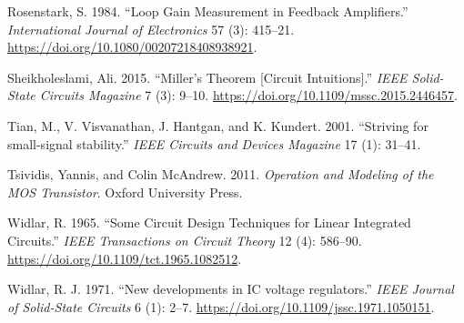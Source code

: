 \documentclass[
  a4paper,
  DIV=11,
  numbers=noendperiod]{scrartcl}
\newlength{\cslhangindent}
\newenvironment{CSLReferences}[2] %
 {\begin{list}{}{%
  \setlength{\itemindent}{0pt}
  \setlength{\leftmargin}{0pt}
  \setlength{\parsep}{0pt}
  \ifodd #1
   \setlength{\leftmargin}{\cslhangindent}
   \setlength{\itemindent}{-1\cslhangindent}
  \fi
  \setlength{\itemsep}{#2\baselineskip}}}
 {\end{list}}
\begin{document}
\begin{CSLReferences}{1}{0}
Rosenstark, S. 1984. {``Loop Gain Measurement in Feedback Amplifiers.''}
\emph{International Journal of Electronics} 57 (3): 415--21.
\url{https://doi.org/10.1080/00207218408938921}.

Sheikholeslami, Ali. 2015. {``{Miller's Theorem {[}Circuit
Intuitions{]}}.''} \emph{IEEE Solid-State Circuits Magazine} 7 (3):
9--10. \url{https://doi.org/10.1109/mssc.2015.2446457}.

Tian, M., V. Visvanathan, J. Hantgan, and K. Kundert. 2001. {``{Striving
for small-signal stability}.''} \emph{IEEE Circuits and Devices
Magazine} 17 (1): 31--41.

Tsividis, Yannis, and Colin McAndrew. 2011. \emph{Operation and Modeling
of the MOS Transistor}. Oxford University Press.

Widlar, R. 1965. {``{Some Circuit Design Techniques for Linear
Integrated Circuits}.''} \emph{IEEE Transactions on Circuit Theory} 12
(4): 586--90. \url{https://doi.org/10.1109/tct.1965.1082512}.

Widlar, R. J. 1971. {``{New developments in IC voltage regulators}.''}
\emph{IEEE Journal of Solid-State Circuits} 6 (1): 2--7.
\url{https://doi.org/10.1109/jssc.1971.1050151}.

\end{CSLReferences}
\end{document}
